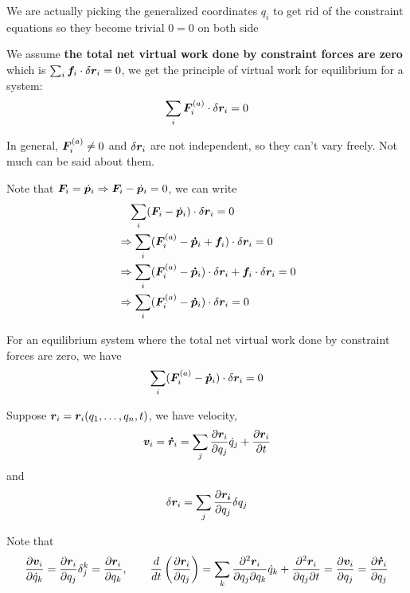 \documentclass[12pt]{article}
\begin{document}
We are actually picking the generalized coordinates $q_i$ to get rid of the constraint equations so they become trivial $0=0$ on both side

\begin{theorem}
\textnormal{We assume \textbf{the total net virtual work done by constraint forces are zero} which is $\sum_i \boldsymbol{f}_i \cdot \delta \boldsymbol{r}_i = 0$,  we get the principle of virtual work for equilibrium for a system: $$ \sum_i \boldsymbol{F}^{(a)}_i \cdot \delta \boldsymbol{r}_i  = 0$$}
\end{theorem}
In general, $\boldsymbol{F}^{(a)}_i \neq 0$ and $\delta \boldsymbol{r}_i$ are not independent, so they can't vary freely. Not much can be said about them.

Note that $\boldsymbol{F}_i = \dot{\boldsymbol{p}}_i \Rightarrow \boldsymbol{F}_i - \dot{\boldsymbol{p}}_i = 0$, we can write 
$$
 \begin{aligned}
   &\quad \sum_i (\boldsymbol{F}_i - \dot{\boldsymbol{p}}_i) \cdot \delta \boldsymbol{r}_i  = 0 \\
   &\Rightarrow \sum_i ( \boldsymbol{F}^{(a)}_i  - \boldsymbol{\dot{p}}_i  + \boldsymbol{f}_i ) \cdot \delta \boldsymbol{r}_i = 0 \\
   &\Rightarrow \sum_i ( \boldsymbol{F}^{(a)}_i  - \boldsymbol{\dot{p}}_i) \cdot \delta \boldsymbol{r}_i + \boldsymbol{f}_i \cdot \delta \boldsymbol{r}_i = 0 \\ 
   &\Rightarrow \sum_i ( \boldsymbol{F}^{(a)}_i  - \boldsymbol{\dot{p}}_i) \cdot \delta \boldsymbol{r}_i = 0 \\
 \end{aligned}
$$

\begin{theorem}
\textnormal{ For an equilibrium system where the total net virtual work done by constraint forces are zero, we have $$\sum_i ( \boldsymbol{F}^{(a)}_i  - \boldsymbol{\dot{p}}_i) \cdot \delta \boldsymbol{r}_i = 0$$}
\end{theorem}

Suppose $\boldsymbol{r}_i = \boldsymbol{r}_i(q_1, \ldots, q_n, t)$,  we have velocity, $$\boldsymbol{v}_i = \boldsymbol{\dot{r}}_i = \sum_j \frac{\partial \boldsymbol{r}_i}{\partial q_j} \dot{q}_j + \frac{\partial \boldsymbol{r}_i}{\partial t} $$
and $$ \delta \boldsymbol{r}_i = \sum_j \frac{\partial \boldsymbol{r_i}}{\partial q_j} \delta q_j$$

Note that 
$$\frac{\partial \boldsymbol{v}_i}{\partial \dot{q}_k} = \frac{\partial \boldsymbol{r}_i}{\partial q_j} \delta^k_j =  \frac{\partial \boldsymbol{r}_i}{\partial q_k}, \quad \quad \frac{d}{dt}\left(\frac{\partial \boldsymbol{r}_i}{\partial q_j} \right) 
= \sum_k \frac{\partial^2 \boldsymbol{r}_i}{\partial q_j \partial q_k} \dot{q}_k + \frac{\partial^2 \boldsymbol{r}_i}{\partial q_j \partial t} 
= \frac{\partial \boldsymbol{v}_i}{\partial q_j} 
= \frac{\partial \boldsymbol{\dot{r}}_i}{\partial q_j} $$
\end{document}
